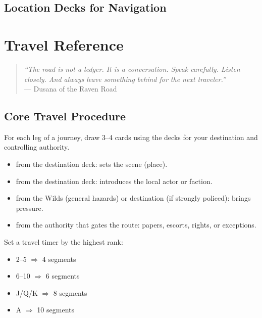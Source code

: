 \documentclass[11pt,letterpaper,twoside]{book}
\begin{document}
\section{Location Decks for Navigation}

\newpage
\chapter{Travel Reference}
\label{chap:travel-reference}

\begin{quote}
\small
\textit{``The road is not a ledger. It is a conversation. Speak carefully. Listen closely. And always leave something behind for the next traveler.''} \\
--- Dusana of the Raven Road
\end{quote}

\section{Core Travel Procedure}

For each leg of a journey, draw 3--4 cards using the decks for your destination and controlling authority.

\begin{itemize}
\item \spadesuit{} from the destination deck: sets the scene (place).
\item \heartsuit{} from the destination deck: introduces the local actor or faction.
\item \clubsuit{} from the Wilds (general hazards) or destination (if strongly policed): brings pressure.
\item \diamondsuit{} from the authority that gates the route: papers, escorts, rights, or exceptions.
\end{itemize}

Set a travel timer by the highest rank:
\begin{itemize}
\item 2--5 $\Rightarrow$ 4 segments
\item 6--10 $\Rightarrow$ 6 segments
\item J/Q/K $\Rightarrow$ 8 segments
\item A $\Rightarrow$ 10 segments
\end{itemize}
\end{document}
